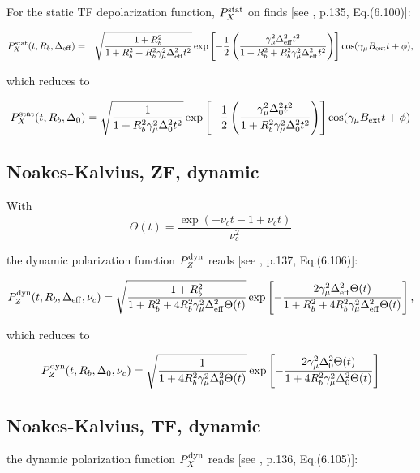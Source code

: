 \documentclass[a4paper,10pt]{article}
\begin{document}
\noindent For the static TF depolarization function, $P_{X}^{\rm stat}$ on finds [see \cite{yaouanc11}, p.135, Eq.(6.100)]:

\begin{eqnarray*}
 P_{X}^{\rm stat}(t, R_b, \Delta_{\rm eff}) &=& \sqrt{\frac{1+R_b^2}{1+R_b^2+R_b^2 \gamma_\mu^2 \Delta_{\rm eff}^2 t^2}} 
   \exp\left[-\frac{1}{2}\left(\frac{\gamma_\mu^2 \Delta_{\rm eff}^2 t^2}{1+R_b^2+R_b^2\gamma_\mu^2 \Delta_{\rm eff}^2 t^2}\right)\right]
   \cos(\gamma_\mu B_{\rm ext} t + \phi),
\end{eqnarray*}

\noindent which reduces to 

\begin{equation}
  P_{X}^{\rm stat}(t, R_b, \Delta_0) = \sqrt{\frac{1}{1+R_b^2 \gamma_\mu^2 \Delta_0^2 t^2}} 
    \exp\left[-\frac{1}{2} \left(\frac{\gamma_\mu^2 \Delta_0^2 t^2}{1+R_b^2\gamma_\mu^2 \Delta_0^2 t^2}\right)\right] \cos(\gamma_\mu B_{\rm ext} t + \phi)
\end{equation}

\subsection*{Noakes-Kalvius, ZF, dynamic}

\noindent With
$$ \Theta(t) = \frac{\exp(-\nu_c t - 1 + \nu_c t)}{\nu_c^2} $$

the dynamic polarization function $P_{Z}^{\rm dyn}$ reads [see \cite{yaouanc11}, p.137, Eq.(6.106)]:

$$ P_{Z}^{\rm dyn}(t, R_b, \Delta_{\rm eff}, \nu_c) = \sqrt{\frac{1+R_b^2}{1+R_b^2+4 R_b^2 \gamma_\mu^2 \Delta_{\rm eff}^2 \Theta(t)}}
  \exp\left[-\frac{2\gamma_\mu^2 \Delta_{\rm eff}^2 \Theta(t)}{1+R_b^2+4 R_b^2\gamma_\mu^2 \Delta_{\rm eff}^2 \Theta(t)}\right],
$$

\noindent which reduces to 

\begin{equation}
 P_{Z}^{\rm dyn}(t, R_b, \Delta_0, \nu_c) = \sqrt{\frac{1}{1+4 R_b^2 \gamma_\mu^2 \Delta_0^2 \Theta(t)}}
  \exp\left[-\frac{2 \gamma_\mu^2 \Delta_0^2 \Theta(t)}{1+4 R_b^2 \gamma_\mu^2 \Delta_0^2 \Theta(t)}\right]
\end{equation}

\subsection*{Noakes-Kalvius, TF, dynamic}

the dynamic polarization function $P_{X}^{\rm dyn}$ reads [see \cite{yaouanc11}, p.136, Eq.(6.105)]:
\end{document}
